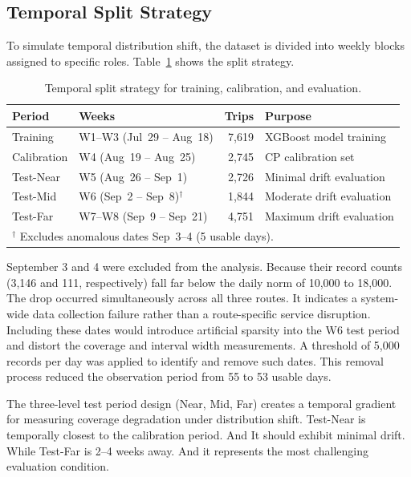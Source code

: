 \documentclass[12pt, a4paper, oneside]{report}
\begin{document}
\subsection{Temporal Split Strategy}
\label{subsec:temporal_split}

To simulate temporal distribution shift, the dataset is divided into weekly blocks assigned to specific roles. Table~\ref{tab:temporal_split} shows the split strategy.

\begin{table}[H]
\centering
\caption{Temporal split strategy for training, calibration, and evaluation.}
\label{tab:temporal_split}
\begin{tabular}{llrl}
\toprule
\textbf{Period} & \textbf{Weeks} & \textbf{Trips} & \textbf{Purpose} \\
\midrule
Training & W1--W3 (Jul~29 -- Aug~18) & 7,619 & XGBoost model training \\
Calibration & W4 (Aug~19 -- Aug~25) & 2,745 & CP calibration set \\
Test-Near & W5 (Aug~26 -- Sep~1) & 2,726 & Minimal drift evaluation \\
Test-Mid & W6 (Sep~2 -- Sep~8)$^\dagger$ & 1,844 & Moderate drift evaluation \\
Test-Far & W7--W8 (Sep~9 -- Sep~21) & 4,751 & Maximum drift evaluation \\
\bottomrule
\multicolumn{4}{l}{\footnotesize $^\dagger$ Excludes anomalous dates Sep~3--4 (5 usable days).}
\end{tabular}
\end{table}

September 3 and 4 were excluded from the analysis. Because their record counts (3,146 and 111, respectively) fall far below the daily norm of 10,000 to 18,000. The drop occurred simultaneously across all three routes. It indicates a system-wide data collection failure rather than a route-specific service disruption. Including these dates would introduce artificial sparsity into the W6 test period and distort the coverage and interval width measurements. A threshold of 5,000 records per day was applied to identify and remove such dates. This removal process reduced the observation period from 55 to 53 usable days.

The three-level test period design (Near, Mid, Far) creates a temporal gradient for measuring coverage degradation under distribution shift. Test-Near is temporally closest to the calibration period. And It should exhibit minimal drift. While Test-Far is 2--4 weeks away. And it represents the most challenging evaluation condition.
\end{document}
